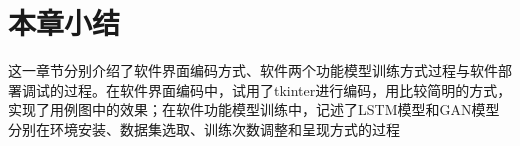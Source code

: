 \section{本章小结}
这一章节分别介绍了软件界面编码方式、软件两个功能模型训练方式过程与软件部署调试的过程。在软件界面编码中，试用了tkinter进行编码，用比较简明的方式，实现了用例图中的效果；在软件功能模型训练中，记述了LSTM模型和GAN模型分别在环境安装、数据集选取、训练次数调整和呈现方式的过程




